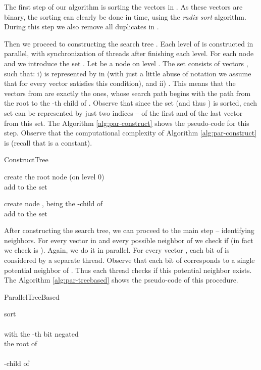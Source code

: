 \documentclass[a4paper]{article}
\begin{document}
The first step of our algorithm is sorting the vectors in . As these vectors are binary, the sorting can clearly be done in  time, using the {\em radix sort} algorithm.
During this step we also remove all duplicates in .

Then we proceed to constructing the search tree .
Each level of  is constructed in parallel, with synchronization of threads after finishing each level.
For each node  and  we introduce the set . Let  be a node on level .
The set  consists of vectors , such that: i)  is represented by  in  (with just a little abuse of notation we assume that for  every vector satisfies this condition), and ii) .
This means that the vectors from  are exactly the ones, whose search path begins with the path from the root to the -th child of . Observe that since the set  (and thus ) is sorted, each set  can be represented by just two indices -- of the first and of the last vector from this set.
The Algorithm \ref{alg:par-construct} shows the pseudo-code for this step. Observe that the computational complexity of Algorithm \ref{alg:par-construct} is  (recall that  is a constant).

\begin{algorithm}[htb]
\small
\caption {ConstructTree}
\label{alg:par-construct}
\KwIn{}
create the root node (on level 0)\\
\lForEach{}
		{
			add  to the set 
		}	


\For{ \KwTo }
{
{
	\If {}
	{
		create node , being the -child of \\
		\lForEach{}
		{
			add  to the set 
		}	
	}	
}
}

\end{algorithm}

After constructing the search tree, we can proceed to the main step -- identifying neighbors.
For every vector in  and every possible neighbor  of  we check if  (in fact we check is ). Again, we do it in parallel.
For every vector , each bit of  is considered by a separate thread.
Observe that each bit of  corresponds to a single potential neighbor of . Thus each thread checks if this potential neighbor exists. The Algorithm \ref{alg:par-treebased} shows the pseudo-code of this procedure.

\begin{algorithm}[htb]
\small
\caption {ParallelTreeBased}
\label{alg:par-treebased}
\KwIn{}
sort \\
\\
\BPFor{}
{
	\TPFor{}
	{
	  with the -th bit negated\\
	 the root of \\
	\For { \KwTo }
	{
		\\
		 {\Stop}
		-child of \\
	}
		\Print {}
	}
}
\end{algorithm}
\end{document}
